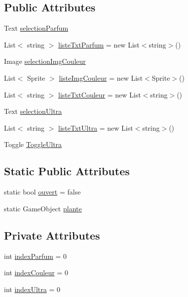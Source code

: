 \subsection*{Public Attributes}
\begin{DoxyCompactItemize}
\item 
Text \mbox{\hyperlink{class_creation_plante_insectes_ae171d64083bde1ed4d7ccf8797376a3d}{selection\+Parfum}}
\item 
List$<$ string $>$ \mbox{\hyperlink{class_creation_plante_insectes_a793d5f29e033929d9cf2e7b1135fc2b8}{liste\+Txt\+Parfum}} = new List$<$string$>$()
\item 
Image \mbox{\hyperlink{class_creation_plante_insectes_a282eded9456f6eb8b39cecbcadf8895f}{selection\+Img\+Couleur}}
\item 
List$<$ Sprite $>$ \mbox{\hyperlink{class_creation_plante_insectes_a6ad283e8a41ba52ab312069a17fe7b4c}{liste\+Img\+Couleur}} = new List$<$Sprite$>$()
\item 
List$<$ string $>$ \mbox{\hyperlink{class_creation_plante_insectes_a4ffc4046dc9b4c1f4dbc9e5acef59b83}{liste\+Txt\+Couleur}} = new List$<$string$>$()
\item 
Text \mbox{\hyperlink{class_creation_plante_insectes_a391e430a5ed50750243dbce6a0a730a3}{selection\+Ultra}}
\item 
List$<$ string $>$ \mbox{\hyperlink{class_creation_plante_insectes_a57143b0fe9a139ef2fac4d47ac57c81d}{liste\+Txt\+Ultra}} = new List$<$string$>$()
\item 
Toggle \mbox{\hyperlink{class_creation_plante_insectes_a8ddc64fd85406e87da85761df2b2f419}{Toggle\+Ultra}}
\end{DoxyCompactItemize}
\subsection*{Static Public Attributes}
\begin{DoxyCompactItemize}
\item 
static bool \mbox{\hyperlink{class_creation_plante_insectes_a1ee37de46d868c50d5bf63452c454da9}{ouvert}} = false
\item 
static Game\+Object \mbox{\hyperlink{class_creation_plante_insectes_a053bb08f596684ba2ea7ceee2b533b95}{plante}}
\end{DoxyCompactItemize}
\subsection*{Private Attributes}
\begin{DoxyCompactItemize}
\item 
int \mbox{\hyperlink{class_creation_plante_insectes_a1419e0e2e17d8bb5774bb06ed6fc802c}{index\+Parfum}} = 0
\item 
int \mbox{\hyperlink{class_creation_plante_insectes_a42db215c44c671e62a4a749527b35ad4}{index\+Couleur}} = 0
\item 
int \mbox{\hyperlink{class_creation_plante_insectes_ae8ae369c45a72c7d0ad44cb8e5d961ef}{index\+Ultra}} = 0
\end{DoxyCompactItemize}


